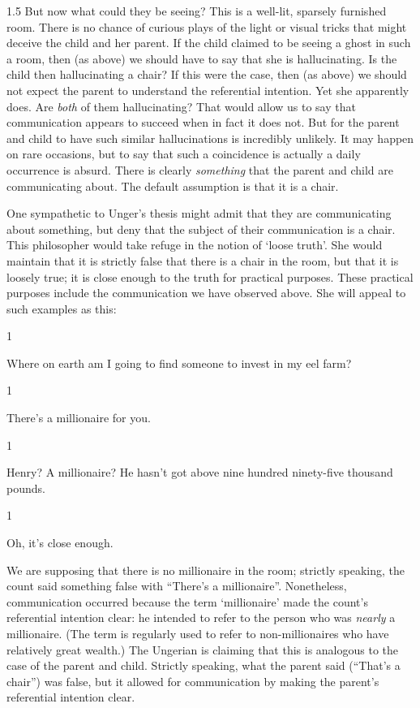 \documentclass[11pt]{article}
\newcommand{\stage}[3]%
{%
	\begin{spacing}{1}%
	\vspace{0pt}
		\begin{description}[style=nextline, parsep=0pt, leftmargin=15mm, itemindent=-10mm, font=\mdseries]
			\item[\textsc{#1} \emph{#2}] #3
		\end{description}%
	\end{spacing}%
}
\begin{document}
\begin{spacing}{1.5}
But now what could they be seeing? This is a well-lit, sparsely furnished room. There is no chance of curious plays of the light or visual tricks that might deceive the child and her parent. If the child claimed to be seeing a ghost in such a room, then (as above) we should have to say that she is hallucinating. Is the child then hallucinating a chair? If this were the case, then (as above) we should not expect the parent to understand the referential intention. Yet she apparently does. Are {\em both} of them hallucinating? That would allow us to say that communication appears to succeed when in fact it does not. But for the parent and child to have such similar hallucinations is incredibly unlikely. It may happen on rare occasions, but to say that such a coincidence is actually a daily occurrence is absurd. There is clearly {\em something} that the parent and child are communicating about. The default assumption is that it is a chair.

One sympathetic to Unger's thesis might admit that they are communicating about something, but deny that the subject of their communication is a chair. This philosopher would take refuge in the notion of `loose truth'. She would maintain that it is strictly false that there is a chair in the room, but that it is loosely true; it is close enough to the truth for practical purposes. These practical purposes include the communication we have observed above. She will appeal to such examples as this:

\stage{Countess}{}{Where on earth am I going to find someone to invest in my eel farm?}

\stage{Count}{(pointing)}{There's a millionaire for you.}

\stage{Countess}{(incredulous)}{Henry? A millionaire? He hasn't got above nine hundred ninety-five thousand pounds.}

\stage{Count}{}{Oh, it's close enough.}

We are supposing that there is no millionaire in the room; strictly speaking, the count said something false with ``There's a millionaire''. Nonetheless, communication occurred because the term `millionaire' made the count's referential intention clear: he intended to refer to the person who was {\em nearly} a millionaire. (The term is regularly used to refer to non-millionaires who have relatively great wealth.) The Ungerian is claiming that this is analogous to the case of the parent and child. Strictly speaking, what the parent said (``That's a chair'') was false, but it allowed for communication by making the parent's referential intention clear.


\end{spacing}
\end{document}
